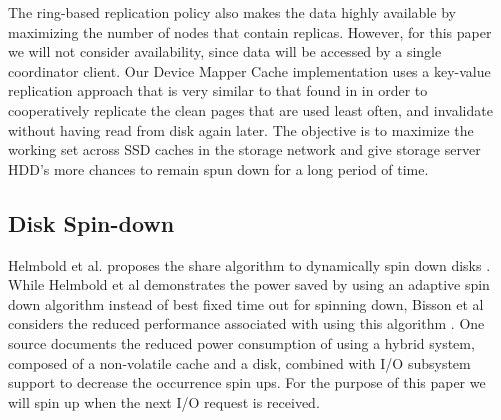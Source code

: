 The ring-based replication policy also makes the data highly available by
maximizing the number of nodes that contain replicas. However, for this paper we
will not consider availability, since data will be accessed by a single
coordinator client. Our Device Mapper Cache implementation uses a key-value
replication approach that is very similar to that found in \cite{chord} in order
to cooperatively replicate the clean pages that are used least often, and
invalidate without having read from disk again later. The objective is to
maximize the working set across SSD caches in the storage network and give
storage server HDD's more chances to remain spun down for a long period of time.

\subsection{Disk Spin-down}

Helmbold et al. proposes the share algorithm to dynamically spin down disks
\cite{disk-spindown}. While Helmbold et al demonstrates the power saved by using
an adaptive spin down algorithm instead of best fixed time out for spinning
down, Bisson et al considers the reduced performance associated with using this
algorithm \cite{spindown-algorithms}. One source documents the reduced power
consumption of using a hybrid system, composed of a non-volatile cache and a
disk, combined with I/O subsystem support to decrease the occurrence spin
ups. For the purpose of this paper we will spin up when the next I/O request is
received.
